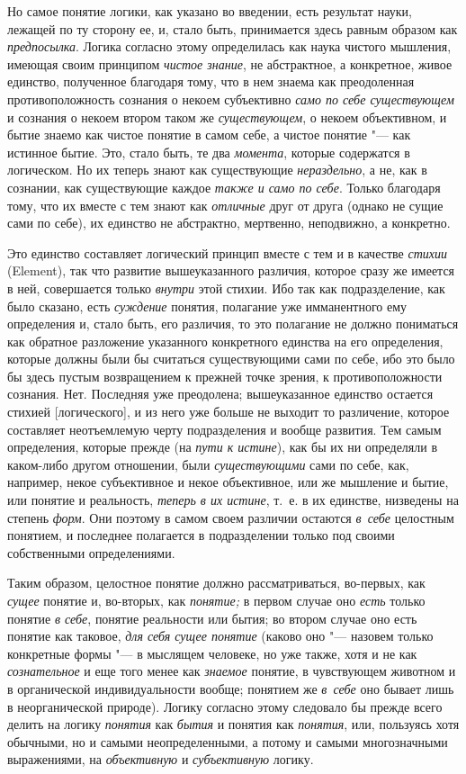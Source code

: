 Но самое понятие логики, как указано во введении, есть результат науки,
лежащей по ту сторону ее, и, стало быть, принимается здесь равным образом
как {\em предпосылка}. Логика согласно этому
определилась как наука чистого мышления, имеющая своим принципом
{\em чистое знание}, не абстрактное, а конкретное,
живое единство, полученное благодаря тому, что в нем знаема как
преодоленная противоположность сознания о некоем субъективно
{\em само по себе существующем} и сознания о некоем
втором таком же {\em существующем}, о некоем
объективном, и бытие знаемо как чистое понятие в самом себе, а чистое
понятие "--- как истинное бытие. Это, стало быть, те два
{\em момента}, которые содержатся в логическом. Но их теперь знают как
существующие {\em нераздельно}, а
не, как в сознании, как существующие каждое {\em также
и само по себе}. Только благодаря тому, что их вместе с тем знают как
{\em отличные} друг от друга (однако не сущие сами по
себе), их единство не абстрактно, мертвенно, неподвижно, а конкретно.

Это единство составляет логический принцип вместе с тем и в качестве
{\em стихии} (Element), так что развитие вышеуказанного
различия, которое сразу же имеется в ней, совершается только
{\em внутри} этой стихии. Ибо так как подразделение,
как было сказано, есть {\em суждение} понятия,
полагание уже имманентного ему определения и, стало быть, его различия, то
это полагание не должно пониматься как обратное разложение указанного
конкретного единства на его определения, которые должны были бы считаться
существующими сами по себе, ибо это было бы здесь пустым возвращением к
прежней точке зрения, к противоположности сознания. Нет. Последняя уже
преодолена; вышеуказанное единство остается стихией [логического], и из
него уже больше не выходит то различение, которое составляет неотъемлемую
черту подразделения и вообще развития. Тем самым определения, которые
прежде (на {\em пути к истине}), как бы их ни
определяли в каком-либо другом отношении, были
{\em существующими} сами по себе, как, например, некое
субъективное и некое объективное, или же мышление и бытие, или понятие и
реальность, {\em теперь в их истине}, т.~е. в их
единстве, низведены на степень {\em форм}. Они поэтому
в самом своем различии остаются {\em в~себе} целостным
понятием, и последнее полагается в подразделении только под своими
собственными определениями.

Таким образом, целостное понятие должно рассматриваться, во-первых, как
{\em сущее} понятие и, во-вторых, как {\em понятие;} в первом случае оно
{\em есть} только понятие {\em в
себе}, понятие реальности или бытия; во втором случае оно есть понятие как
таковое, {\em для себя сущее понятие} (каково оно
"--- назовем только конкретные формы "--- в мыслящем человеке,
но уже также, хотя и не как {\em сознательное} и еще того менее как
{\em знаемое} понятие, в чувствующем животном и в
органической индивидуальности вообще; понятием же
{\em в~себе} оно бывает лишь в неорганической природе).
Логику согласно этому следовало бы прежде всего делить на логику
{\em понятия} как {\em бытия} и понятия как {\em понятия}, или, пользуясь
хотя обычными, но и самыми неопределенными, а потому и самыми многозначными
выражениями, на {\em объективную} и {\em субъективную} логику.

